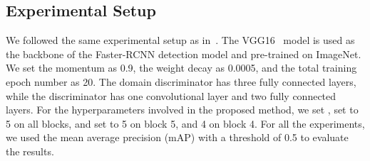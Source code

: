 \documentclass[runningheads]{llncs}
\begin{document}
\subsection{Experimental Setup}
We followed the same experimental setup as in~\cite{chen2018domain}. 
The VGG16~\cite{simonyan2014very} model is used as the backbone of the Faster-RCNN detection model and pre-trained on ImageNet. 
We set the momentum as 0.9, the weight decay as 0.0005, and 
the total training epoch number as 20. 
The domain discriminator  has three fully connected layers,
while the discriminator  has one convolutional layer and two fully connected layers. 
For the hyperparameters involved in the proposed method, 
we set , set  to 5 on all blocks, and set  to 5 on block 5, and 4 on block 4. 
For all the experiments, we used the mean average precision (mAP) with a threshold of 0.5 to evaluate the results.
\end{document}
